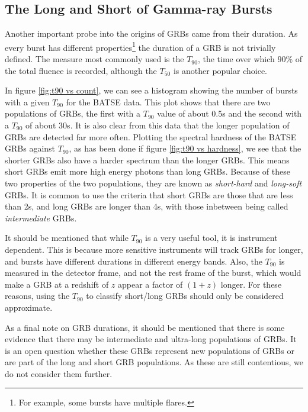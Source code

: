 \documentclass[11pt]{cuthesis}
\begin{document}
\subsection{The Long and Short of Gamma-ray Bursts}
Another important probe into the origins of GRBs came from their duration. As every burst has different properties\footnote{For example, some bursts have multiple flares.} the duration of a GRB is not trivially defined. The measure most commonly used is the $T_{90}$, the time over which $90\%$ of the total fluence is recorded, although the $T_{50}$ is another popular choice. 

In figure \ref{fig:t90 vs count}, we can see a histogram showing the number of bursts with a given $T_{90}$ for the BATSE data. This plot shows that there are two populations of GRBs, the first with a $T_{90}$ value of about 0.5s and the second with a $T_{90}$ of about 30s. It is also clear from this data that the longer population of GRBs are detected far more often. Plotting the spectral hardness of the BATSE GRBs against $T_{90}$, as has been done if figure \ref{fig:t90 vs hardness}, we see that the shorter GRBs also have a harder spectrum than the longer GRBs. This means short GRBs emit more high energy photons than long GRBs. Because of these two properties of the two populations, they are known as \textit{short-hard} and \textit{long-soft} GRBs. It is common to use the criteria that short GRBs are those that are less than 2s, and long GRBs are longer than 4s, with those inbetween being called \textit{intermediate} GRBs.

It should be mentioned that while $T_{90}$ is a very useful tool, it is instrument dependent. This is because more sensitive instruments will track GRBs for longer, and bursts have different durations in different energy bands. Also, the $T_{90}$ is measured in the detector frame, and not the rest frame of the burst, which would make a GRB at a redshift of $z$ appear a factor of $(1+z)$ longer. For these reasons, using the $T_{90}$ to classify short/long GRBs should only be considered approximate.  

As a final note on GRB durations, it should be mentioned that there is some evidence that there may be intermediate and ultra-long populations of GRBs. It is an open question whether these GRBs represent new populations of GRBs or are part of the long and short GRB populations. As these are still contentious, we do not consider them further. 
\end{document}
